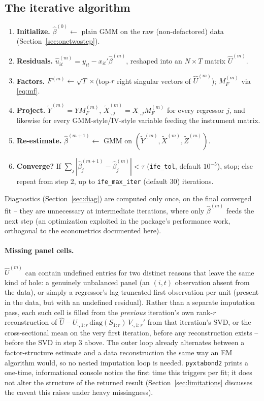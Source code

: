 \documentclass[11pt,a4paper]{article}
\newcommand{\pkg}{\texttt{pyxtabond2}}
\begin{document}
\subsection{The iterative algorithm}
\label{sec:ifealgo}

\begin{enumerate}[nosep]
  \item \textbf{Initialize.} $\hat\beta^{(0)}\leftarrow$ plain GMM on the
    raw (non-defactored) data (Section~\ref{sec:onetwostep}).
  \item \textbf{Residuals.} $\hat u_{it}^{(m)} = y_{it}-x_{it}'\hat\beta^{(m)}$,
    reshaped into an $N\times T$ matrix $\hat U^{(m)}$.
  \item \textbf{Factors.} $F^{(m)}\leftarrow\sqrt{T}\times$(top-$r$ right
    singular vectors of $\hat U^{(m)}$); $M_F^{(m)}$ via \eqref{eq:mf}.
  \item \textbf{Project.} $\tilde Y^{(m)}=YM_F^{(m)}$, $\tilde
    X^{(m)}_{\cdot,j}=X_{\cdot,j}M_F^{(m)}$ for every regressor $j$, and
    likewise for every GMM-style/IV-style variable feeding the instrument
    matrix.
  \item \textbf{Re-estimate.} $\hat\beta^{(m+1)}\leftarrow$ GMM on
    $(\tilde Y^{(m)},\tilde X^{(m)},\tilde Z^{(m)})$.
  \item \textbf{Converge?} If $\sum_j|\hat\beta^{(m+1)}_j-\hat\beta^{(m)}_j|<\tau$
    (\texttt{ife\_tol}, default $10^{-5}$), stop; else repeat from step 2, up to
    \texttt{ife\_max\_iter} (default 30) iterations.
\end{enumerate}
Diagnostics (Section~\ref{sec:diag}) are computed only once, on the final
converged fit -- they are unnecessary at intermediate iterations, where only
$\hat\beta^{(m)}$ feeds the next step (an optimization exploited in the
package's performance work, orthogonal to the econometrics documented here).

\paragraph{Missing panel cells.} $\hat U^{(m)}$ can contain undefined
entries for two distinct reasons that leave the same kind of hole: a
genuinely unbalanced panel (an $(i,t)$ observation absent from the data),
or simply a regressor's lag-truncated first observation per unit (present
in the data, but with an undefined residual). Rather than a separate
imputation pass, each such cell is filled from the \emph{previous}
iteration's own rank-$r$ reconstruction of $\hat U$ -- $U_{\cdot,1:r}\,
\mathrm{diag}(S_{1:r})\,V_{\cdot,1:r}'$ from that iteration's SVD, or the
cross-sectional mean on the very first iteration, before any reconstruction
exists -- before the SVD in step 3 above. The outer loop already
alternates between a factor-structure estimate and a data reconstruction
the same way an EM algorithm would, so no nested imputation loop is
needed. \pkg{} prints a one-time, informational console notice the first
time this triggers per fit; it does not alter the structure of the
returned result (Section~\ref{sec:limitations} discusses the caveat this
raises under heavy missingness).
\end{document}
